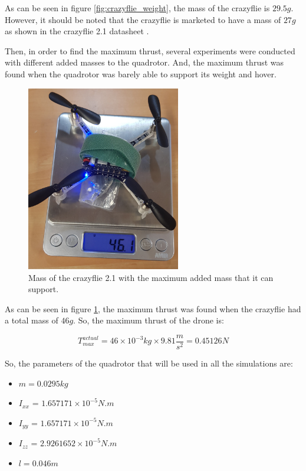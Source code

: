 \documentclass{thesisreport}
\begin{document}
As can be seen in figure \ref{fig:crazyflie_weight}, the mass of the crazyflie is $29.5g$. However, it should be noted that the crazyflie is marketed to have a mass of $27g$ as shown in the crazyflie 2.1 datasheet \cite{crazyflie_datasheet}.

Then, in order to find the maximum thrust, several experiments were conducted with different added masses to the quadrotor. And, the maximum thrust was found when the quadrotor was barely able to support its weight and hover.

\newpage

\begin{figure}[h]
	\centering
	\includegraphics[width=0.6\textwidth, angle =-90]{Images/crazyflie/max_thrust.jpg}
	\caption{Mass of the crazyflie 2.1 with the maximum added mass that it can support.}
	\label{fig:max_thrust}
\end{figure}

As can be seen in figure \ref{fig:max_thrust}, the maximum thrust was found when the crazyflie had a total mass of $46g$. So, the maximum thrust of the drone is:

\begin{equation}
	T_{max}^{actual} = 46 \times 10^{-3} kg \times 9.81 \frac{m}{s^2} = 0.45126 N
\end{equation}

So, the parameters of the quadrotor that will be used in all the simulations are:

\begin{itemize}
	\item $m = 0.0295 kg$
	\item $I_{xx}$ = $1.657171 \times 10^{-5} N.m$
	\item $I_{yy}$ = $1.657171 \times 10^{-5} N.m$
	\item $I_{zz}$ = $2.9261652 \times 10^{-5} N.m$
	\item $l = 0.046m$
	
\end{itemize}
\end{document}
